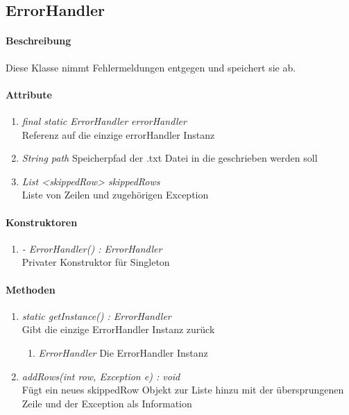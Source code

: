 \subsection{ErrorHandler}

\paragraph{Beschreibung}
Diese Klasse nimmt Fehlermeldungen entgegen und speichert sie ab.

\paragraph{Attribute}

\begin{enumerate}[$\bullet$]
	\item \textit{final static ErrorHandler errorHandler} \\Referenz auf die einzige errorHandler Instanz
	\item \textit{String path} Speicherpfad der .txt Datei in die geschrieben werden soll
	\item \textit{List <skippedRow> skippedRows} \\ Liste von Zeilen und zugehörigen Exception
\end{enumerate}

\paragraph{Konstruktoren}
\begin{enumerate}[+]
	\item \textit{ - ErrorHandler() : ErrorHandler}  \\Privater Konstruktor für Singleton
\end{enumerate}

\paragraph{Methoden}

\begin{enumerate}[+]
	\item \textit{static getInstance() : ErrorHandler} \\ Gibt die einzige ErrorHandler Instanz zurück
\begin{enumerate}[$\circ$]
	\item \textit{ErrorHandler} Die ErrorHandler Instanz
\end{enumerate}
\item \textit{addRows(int row, Exception e) : void}
\\Fügt ein neues skippedRow Objekt zur Liste hinzu mit der übersprungenen Zeile und der Exception als Information 
\end{enumerate}

